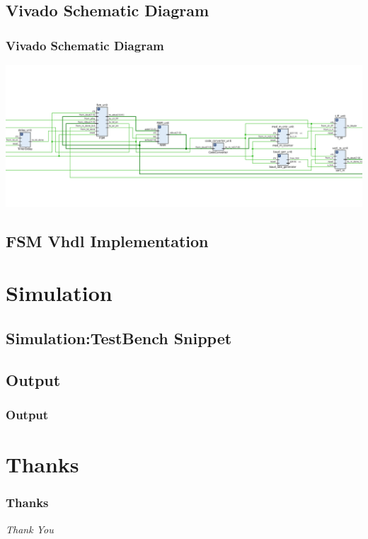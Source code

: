 \documentclass{beamer}
\begin{document}
\subsection{Vivado Schematic Diagram}
\begin{frame}
\frametitle{Vivado Schematic Diagram}
\includegraphics[width=\textwidth, height=0.8\textheight] {../diagram/schematic_diagram.png}
\end{frame}

\subsection{FSM Vhdl Implementation}
\begin{tiny}

\end{tiny}

\break

\section{Simulation}
\subsection{Simulation:TestBench Snippet}
\begin{tiny}

\end{tiny}

\break

\subsection{Output}
\begin{frame}
\frametitle{Output}
\end{frame}

\section{Thanks}
\begin{frame}
\frametitle{Thanks}
\centering \Huge
  \emph{Thank You}
\end{frame}
\end{document}
